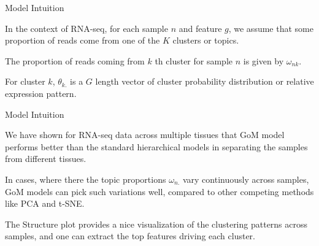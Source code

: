\documentclass{beamer}\usepackage[]{graphicx}\usepackage[]{color}
\begin{document}
\begin{frame}[fragile]{Model Intuition\;\;}

In the context of RNA-seq, for each sample $n$ and feature $g$, we assume that some proportion of reads come from one of the $K$ clusters or topics. \pause \newline

The proportion of reads coming from $k$ th cluster for sample $n$ is given by $\omega_{nk}$. \pause \newline

For cluster $k$, $\theta_{k.}$ is a $G$ length vector of cluster probability distribution or relative expression pattern. \pause \newline

\end{frame}

\begin{frame}[fragile]{Model Intuition\;\;}

We have shown for RNA-seq data across multiple tissues that GoM model performs better than the standard hierarchical models in separating the samples from different tissues. \pause \newline

In cases, where there the topic proportions $\omega_{n.}$ vary continuously across samples, GoM models can pick such variations well, compared to other competing methods like PCA and t-SNE. \pause \newline

The Structure plot provides a nice visualization of the clustering patterns across samples, and one can extract the top features driving each cluster. \pause \newline

\end{frame}
\end{document}
